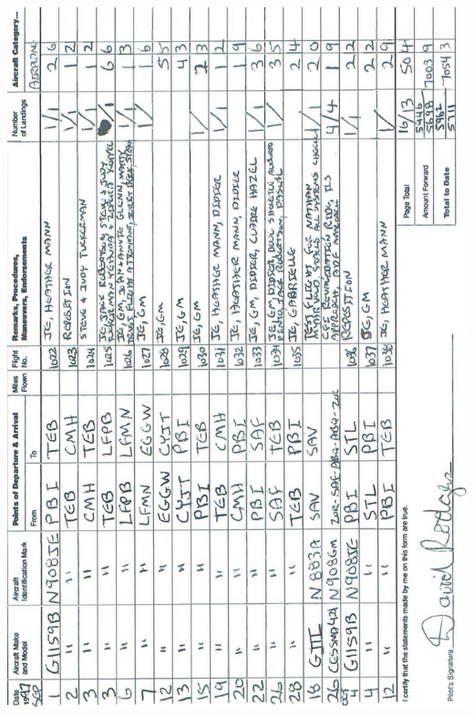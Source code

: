 \documentclass[10pt]{article}
\begin{document}
\includegraphics[max width=\textwidth, center]{2025_02_27_dd68c3d38de88f0516d9g-054}\\
\end{document}
